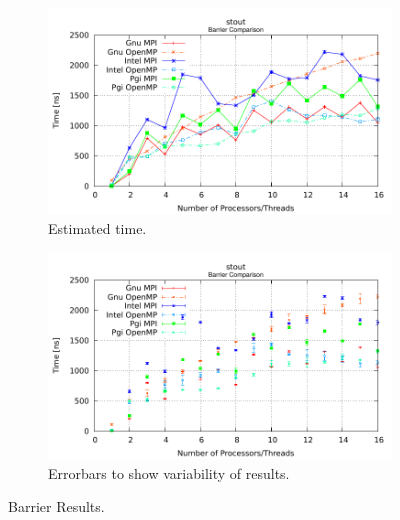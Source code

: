 \medskip


\begin{figure} [h!]
    \centering
    \captionsetup{justification=centering, singlelinecheck=false}
    \begin{subfigure}{.6\textwidth}
      \hspace*{-1.5cm} 
      \includegraphics[width=0.95\linewidth]{Plots/barrier/stout.pdf}
      \caption[]{Estimated time.}
      \label{fig:Barrier}
    \end{subfigure}%
    \begin{subfigure}{.6\textwidth}
      \hspace*{-1.5cm} 
      \includegraphics[width=0.95\linewidth]{Plots/barrier/stoutError.pdf}
      \caption{Errorbars to show variability of results.}
      \label{fig:BarrierErrorBars}
    \end{subfigure}
\caption{Barrier Results.}
\label{fig:BarrierAndErrorBars}
\end{figure}





